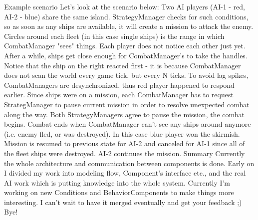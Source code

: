 Example scenario
Let's look at the scenario below:
Two AI players (AI-1 - red, AI-2 - blue) share the same island.
StrategyManager checks for such conditions, so as soon as any ships are available, it will create a mission to attack the enemy.
Circles around each fleet (in this case single ships) is the range in which CombatManager "sees" things.
Each player does not notice each other just yet.
After a while, ships get close enough for CombatManager's to take the handles.
Notice that the ship on the right reacted first - it is because CombatManager does not scan the world every game tick, but every N ticks.
To avoid lag spikes, CombatManagers are desynchronized, thus red player happened to respond earlier.
Since ships were on a mission, each CombatManager has to request StrategManager to pause current mission in order to resolve unexpected combat along the way.
Both StrategyManagers agree to pause the mission, the combat begins.
Combat ends when CombatManager can't see any ships around anymore (i.e. enemy fled, or was destroyed).
In this case blue player won the skirmish.
Mission is resumed to previous state for AI-2 and canceled for AI-1 since all of the fleet ships were destroyed.
AI-2 continues the mission.
Summary
Currently the whole architecture and communication between components is done.
Early on I divided my work into modeling flow, Component's interface etc., and the real AI work which is putting knowledge into the whole system.
Currently I'm working on new Conditions and BehaviorComponents to make things more interesting.
I can't wait to have it merged eventually and get your feedback ;)
Bye!
